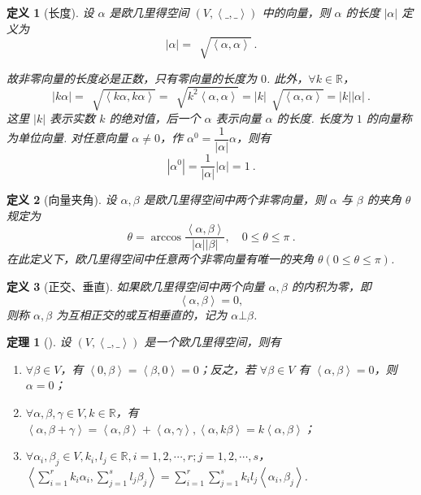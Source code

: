 \documentclass[zihao=-4,UTF8,linespread=1.8,nothm]{aytony_base}
\newtheorem{theorem}{\indent 定理}[subsection]
\newtheorem{definition}{\indent 定义}[subsection]
\begin{document}
\begin{definition}[长度]
    设 $\alpha$ 是欧几里得空间 $(V, \left<\_, \_\right>)$ 中的向量，则 $\alpha$ 的长度 $|\alpha|$ 定义为 $$
        |\alpha| = \,\sqrt[]{\left<\alpha, \alpha\right>}\ .
    $$

    故非零向量的长度必是正数，只有零向量的长度为 $0$. 此外，$\forall k \in \mathbb{R}$，$$
        |k \alpha| = \,\sqrt[]{\left<k \alpha, k \alpha\right>} = \,\sqrt[]{k^2 \left<\alpha, \alpha\right>} = |k|\,\sqrt[]{\left<\alpha, \alpha\right>} = |k||\alpha|\ .
    $$ 这里 $|k|$ 表示实数 $k$ 的绝对值，后一个 $\alpha$ 表示向量 $\alpha$ 的长度. 长度为 $1$ 的向量称为单位向量. 对任意向量 $\alpha \neq 0$，作 $\alpha^0 = \dfrac{1}{|\alpha|} \alpha$，则有 $$
        |\alpha^0| = \dfrac{1}{|\alpha|}|\alpha| = 1\ .
    $$
\end{definition}

\begin{definition}[向量夹角]
    设 $\alpha, \beta$ 是欧几里得空间中两个非零向量，则 $\alpha$ 与 $\beta$ 的夹角 $\theta$ 规定为 $$
        \theta = \arccos \dfrac{\left<\alpha, \beta\right>}{|\alpha||\beta|},\quad 0 \leqslant \theta \leqslant \pi\ .
    $$ 在此定义下，欧几里得空间中任意两个非零向量有唯一的夹角 $\theta(0 \leqslant \theta \leqslant \pi)$.
\end{definition}

\begin{definition}[正交、垂直]
    如果欧几里得空间中两个向量 $\alpha, \beta$ 的内积为零，即 $$
        \left<\alpha, \beta\right> = 0,
    $$ 则称 $\alpha, \beta$ 为互相正交的或互相垂直的，记为 $\alpha \bot \beta$.
\end{definition}

\begin{theorem}[]
    设 $(V, \left<\_,\_\right>)$ 是一个欧几里得空间，则有

    \begin{enumerate}[nosep]
        \item $\forall \beta \in V$，有 $\left<0,\beta \right> = \left<\beta, 0\right> = 0$；反之，若 $\forall \beta \in V$ 有 $\left<\alpha, \beta\right> = 0$，则 $\alpha = 0$；
        \item $\forall \alpha,\beta, \gamma \in V, k \in \mathbb{R}$，有 $\left<\alpha, \beta + \gamma\right> = \left<\alpha, \beta\right> + \left<\alpha, \gamma\right>, \left<\alpha, k \beta\right> = k \left<\alpha, \beta\right>$；
        \item $\forall \alpha_i, \beta_j \in V, k_i, l_j \in \mathbb{R}, i = 1, 2, \cdots, r; j = 1, 2, \cdots, s$，$\left<\sum\limits_{i=1}^{r}k_i \alpha_i, \sum\limits_{j = 1}^{s}l_j\beta_j\right> = \sum\limits_{i = 1}^{r}\sum\limits_{j = 1}^{s}k_il_j \left<\alpha_i, \beta_j\right>$.
    \end{enumerate}
\end{theorem}
\end{document}
